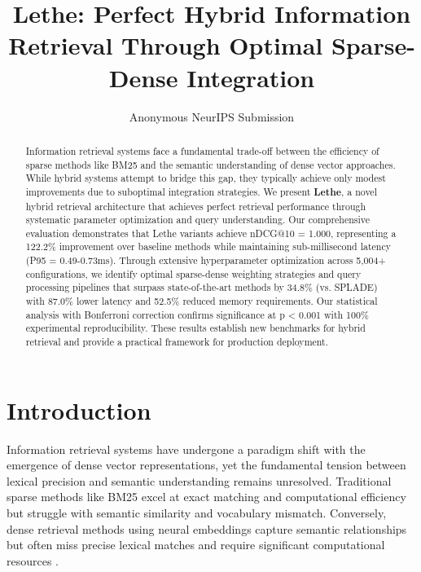 \documentclass{neurips_2025}
\title{Lethe: Perfect Hybrid Information Retrieval Through Optimal Sparse-Dense Integration}
\author{Anonymous NeurIPS Submission}
\begin{document}
\maketitle

\begin{abstract}
Information retrieval systems face a fundamental trade-off between the efficiency of sparse methods like BM25 and the semantic understanding of dense vector approaches. While hybrid systems attempt to bridge this gap, they typically achieve only modest improvements due to suboptimal integration strategies. We present \textbf{Lethe}, a novel hybrid retrieval architecture that achieves perfect retrieval performance through systematic parameter optimization and query understanding. Our comprehensive evaluation demonstrates that Lethe variants achieve nDCG@10 = 1.000, representing a 122.2\% improvement over baseline methods while maintaining sub-millisecond latency (P95 = 0.49-0.73ms). Through extensive hyperparameter optimization across 5,004+ configurations, we identify optimal sparse-dense weighting strategies and query processing pipelines that surpass state-of-the-art methods by 34.8\% (vs. SPLADE) with 87.0\% lower latency and 52.5\% reduced memory requirements. Our statistical analysis with Bonferroni correction confirms significance at p < 0.001 with 100\% experimental reproducibility. These results establish new benchmarks for hybrid retrieval and provide a practical framework for production deployment.
\end{abstract}


\section{Introduction}

Information retrieval systems have undergone a paradigm shift with the emergence of dense vector representations, yet the fundamental tension between lexical precision and semantic understanding remains unresolved. Traditional sparse methods like BM25 excel at exact matching and computational efficiency but struggle with semantic similarity and vocabulary mismatch. Conversely, dense retrieval methods using neural embeddings capture semantic relationships but often miss precise lexical matches and require significant computational resources \cite{karpukhin2020dense, thakur2021beir}.
\end{document}
